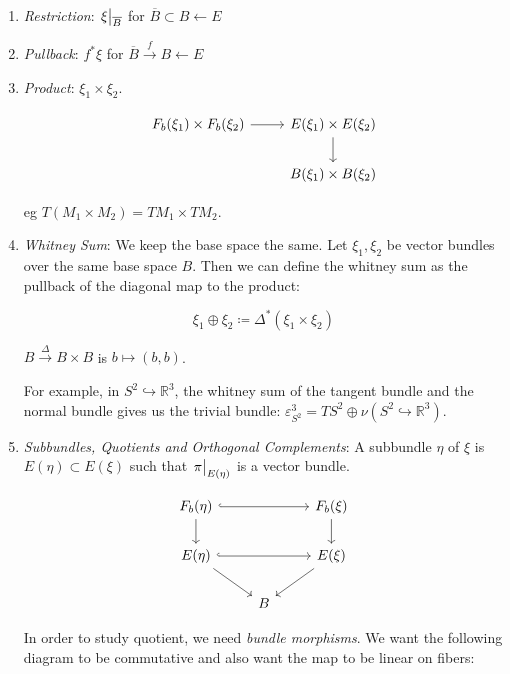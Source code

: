 \documentclass{article}
\theoremstyle{definition}
\begin{document}
    \begin{enumerate}[label=\alph*)]
        \item \textit{Restriction}: \(\eval{\xi}_{\overline{B}}^{}\) for \(\overline{B} \subset B \leftarrow E\)
        \item \textit{Pullback}: \(f^{\ast} \xi\) for \(\overline{B} \xrightarrow{f} B \leftarrow E\)
        \item \textit{Product}: \(\xi_1 \times \xi_2\).
        
        \[
            \begin{tikzcd}
                F_b(\xi_1) \times F_b(\xi_2) \ar[r] & E(\xi_1) \times E(\xi_2) \ar[d] \\ & B(\xi_1) \times B(\xi_2)
            \end{tikzcd}
        \]

        eg \(T(M_1 \times M_2) = TM_1 \times TM_2\).
        \item \textit{Whitney Sum}: We keep the base space the same. Let \(\xi_1, \xi_2\) be vector bundles over the same base space \(B\). Then we can define the whitney sum as the pullback of the diagonal map to the product:
        
        \[
            \xi_1 \oplus \xi_2 \coloneqq \Delta^{\ast} (\xi_1 \times \xi_2)
        \]

        \(B \xrightarrow{\Delta} B \times B\) is \(b \mapsto (b,b)\).

        For example, in \(S^2 \hookrightarrow \mathbb{R}^3\), the whitney sum of the tangent bundle and the normal bundle gives us the trivial bundle: \(\varepsilon ^3_{S^2} = TS^2 \oplus \nu(S^2 \hookrightarrow \mathbb{R}^3)\).

        \item \textit{Subbundles, Quotients and Orthogonal Complements}: A subbundle \(\eta\) of \(\xi\) is \(E(\eta) \subset E(\xi)\) such that \(\eval{\pi}_{E(\eta)}^{} \) is a vector bundle.
        
        \[
            \begin{tikzcd}
                F_b(\eta) \ar[rr, hook] \ar[d] & & F_b(\xi) \ar[d] \\ E(\eta) \ar[rr, hook] \ar[rd] & & E(\xi) \ar[ld] \\ & B
            \end{tikzcd}
        \]

        In order to study quotient, we need \textit{bundle morphisms}. We want the following diagram to be commutative and also want the map to be linear on fibers:


\end{enumerate}
\end{document}

